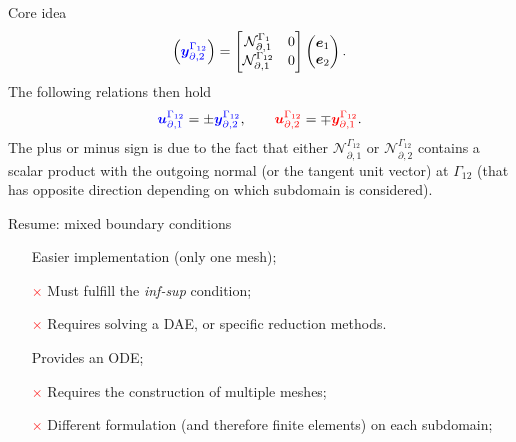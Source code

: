 \documentclass[aspectratio=169]{ISAE-Beamer}
\begin{document}
\begin{frame}{Core idea}
\begin{equation*}
\begin{pmatrix}
\textcolor{blue}{\bm{y}_{\partial, 2}^{\Gamma_{12}}}\\
\end{pmatrix} = \begin{bmatrix}
\mathcal{N}_{\partial, 1}^{\Gamma_1} & 0 \\
\mathcal{N}_{\partial, 1}^{\Gamma_{12}}  & 0 \\
\end{bmatrix} \begin{pmatrix}
\bm{e}_1 \\ \bm{e}_2
\end{pmatrix}.
\end{equation*}
The following relations then hold
\begin{equation*}
\textcolor{blue}{\bm{u}_{\partial, 1}^{\Gamma_{12}}} =\pm \textcolor{blue}{\bm{y}_{\partial, 2}^{\Gamma_{12}}}, \qquad \textcolor{red}{\bm{u}_{\partial, 2}^{\Gamma_{12}}} = \mp \textcolor{red}{\bm{y}_{\partial, 1}^{\Gamma_{12}}}.
\end{equation*}
The plus or minus sign is due to the fact that either $\mathcal{N}_{\partial, 1}^{\Gamma_{12}}$ or $\mathcal{N}_{\partial, 2}^{\Gamma_{12}}$ contains a scalar product with the outgoing normal (or the tangent unit vector) at ${\Gamma_{12}}$ (that has opposite direction depending on which subdomain is considered).
\end{frame}

\begin{frame}{Resume: mixed boundary conditions}

\begin{tcbraster}[raster columns=2, raster equal height]
	\begin{tcolorbox}[width=0.4\textwidth, nobeforeafter, colframe=theme,title=Lagrange multiplier]%
		\begin{itemize}
			\item[\textcolor{green}{\checkmark}] Easier implementation (only one mesh);
			\item[\textcolor{red}{$\times$}] Must fulfill the \textit{inf-sup} condition;	
			\item[\textcolor{red}{$\times$}] Requires solving a DAE, or specific reduction methods.
		\end{itemize}
	\end{tcolorbox} 
	\begin{tcolorbox}[width=0.4\textwidth, nobeforeafter,  colframe=theme,title=Virtual domain decomposition]%
		\begin{itemize}
			\item[\textcolor{green}{\checkmark}] Provides an ODE;
			\item[\textcolor{red}{$\times$}] Requires the construction of multiple meshes;
			\item[\textcolor{red}{$\times$}] Different formulation (and therefore finite elements) on each subdomain;
		\end{itemize}
	\end{tcolorbox}
\end{tcbraster}
\end{frame}
\end{document}

